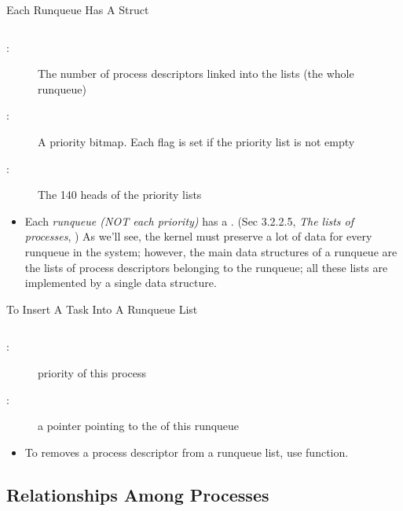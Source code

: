 \begin{frame}{Each Runqueue Has A  Struct}
  \begin{center}
    \begin{varwidth}{.8\textwidth}
      \inputminted{c}{../figs/prio-array-t.c}
    \end{varwidth}
  \end{center}
  \begin{description}
  \item[:] The number of process descriptors linked into the lists (the
    whole runqueue)
  \item[:] A priority bitmap. Each flag is set if the priority list is not
    empty
  \item[:] The 140 heads of the priority lists
  \end{description}
\end{frame}

\begin{itemize}
\item Each \emph{runqueue (NOT each priority)} has a . (Sec 3.2.2.5,
  \emph{The lists of  processes}, \cite{bovet2005understanding}) As
  we'll see, the kernel must preserve a lot of data for every runqueue in the system;
  however, the main data structures of a runqueue are the lists of process descriptors
  belonging to the runqueue; all these lists are implemented by a single
   data structure.
\end{itemize}

\begin{frame}{To Insert A Task Into A Runqueue List}
  \inputminted[fontsize=\footnotesize]{c}{../figs/task-insert2.c}

  \begin{description}
  \item[:] priority of this process
  \item[:] a pointer pointing to the  of this runqueue
  \end{description}

  \begin{itemize}
  \item To removes a process descriptor from a runqueue list, use
     function.
  \end{itemize}
\end{frame}

\subsection{Relationships Among Processes}

